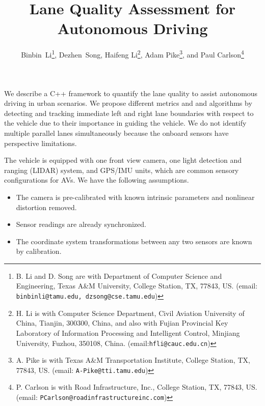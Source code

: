 \documentclass[a4paper]{article}
\begin{document}
\title{Lane Quality Assessment for Autonomous Driving}
\author{
	Binbin~Li\thanks{B. Li and D. Song are with Department of Computer Science and Engineering, Texas A\&M University, College Station, TX, 77843, US. (email: {\tt\footnotesize {binbinli@tamu.edu}, dzsong@cse.tamu.edu})}, 
	Dezhen~Song\footnotemark[1], 
	Haifeng Li\thanks{H. Li is with Computer Science Department, Civil Aviation University of China, Tianjin, 300300, China, and also with Fujian Provincial Key Laboratory of Information Processing and Intelligent Control, Minjiang University, Fuzhou, 350108, China. (email:{\tt\footnotesize hfli@cauc.edu.cn})}, 
	Adam Pike\thanks{A. Pike is with Texas A\&M Transportation Institute, College Station, TX, 77843, US. (email: {\tt\footnotesize A-Pike@tti.tamu.edu})}, 
	and Paul Carlson\thanks{P. Carlson is with Road Infrastructure, Inc., College Station, TX, 77843, US. (email: {\tt\footnotesize  PCarlson@roadinfrastructureinc.com}) }
}



\maketitle

We describe a C++ framework to quantify the lane quality to assist autonomous driving in urban scenarios. We propose different metrics and and algorithms by detecting and tracking immediate left and right lane boundaries with respect to the vehicle due to their importance in guiding the vehicle. We do not identify multiple parallel lanes simultaneously because the onboard sensors have perspective limitations. 

The vehicle is equipped with one front view camera, one light detection and ranging (LIDAR) system, and GPS/IMU units, which are common sensory configurations for AVs. 
We have the following assumptions.
\begin{itemize}
	\item The camera is pre-calibrated with known intrinsic parameters and nonlinear distortion removed.
	\item Sensor readings are already synchronized. 	
	\item The coordinate system transformations between any two sensors are known by calibration.
\end{itemize}
\end{document}

